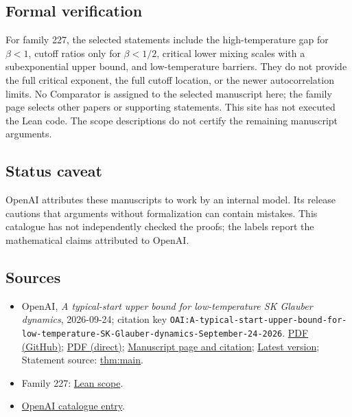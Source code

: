 \documentclass[11pt]{article}
\begin{document}
\subsection{Formal verification}
For family 227, the selected statements include the high-temperature gap for $\beta<1$, cutoff ratios only for $\beta<1/2$, critical lower mixing scales with a subexponential upper bound, and low-temperature barriers. They do not provide the full critical exponent, the full cutoff location, or the newer autocorrelation limits. No Comparator is assigned to the selected manuscript here; the family page selects other papers or supporting statements. This site has not executed the Lean code. The scope descriptions do not certify the remaining manuscript arguments.

\subsection{Status caveat}
OpenAI attributes these manuscripts to work by an internal model. Its release cautions that arguments without formalization can contain mistakes. This catalogue has not independently checked the proofs; the labels report the mathematical claims attributed to OpenAI.

\subsection{Sources}
\begin{itemize}
\item OpenAI, \emph{A typical-start upper bound for low-temperature SK Glauber dynamics}, 2026-09-24; citation key \texttt{OAI:A-typical-start-upper-bound-for-low-temperature-SK-Glauber-dynamics-September-24-2026}. \href{https://github.com/openai/math/blob/adc7f1241b42e322a6451854ab7e4b4c146bf78a/preprints/A-typical-start-upper-bound-for-low-temperature-SK-Glauber-dynamics-September-24-2026/paper.pdf}{PDF (GitHub)}; \href{https://github.com/openai/math/raw/adc7f1241b42e322a6451854ab7e4b4c146bf78a/preprints/A-typical-start-upper-bound-for-low-temperature-SK-Glauber-dynamics-September-24-2026/paper.pdf}{PDF (direct)}; \href{https://github.com/openai/math/blob/adc7f1241b42e322a6451854ab7e4b4c146bf78a/preprints/A-typical-start-upper-bound-for-low-temperature-SK-Glauber-dynamics-September-24-2026/README.md}{Manuscript page and citation}; \href{https://github.com/openai/math/blob/main/preprints/A-typical-start-upper-bound-for-low-temperature-SK-Glauber-dynamics-September-24-2026/paper.pdf}{Latest version}; Statement source: \href{https://github.com/openai/math/blob/adc7f1241b42e322a6451854ab7e4b4c146bf78a/preprints/A-typical-start-upper-bound-for-low-temperature-SK-Glauber-dynamics-September-24-2026/build/introduction.tex\#L49}{thm:main}.
\item Family 227: \href{https://github.com/openai/math/blob/adc7f1241b42e322a6451854ab7e4b4c146bf78a/lean/docs/227.md}{Lean scope}.
\item \href{https://github.com/openai/math/blob/adc7f1241b42e322a6451854ab7e4b4c146bf78a/CONTENTS.md}{OpenAI catalogue entry}.
\end{itemize}
\end{document}
